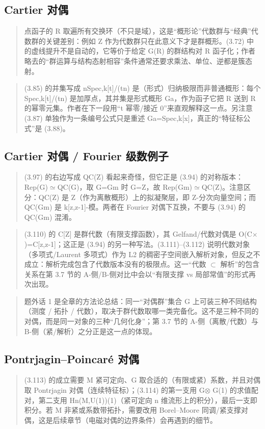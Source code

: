 \subsection*{Cartier 对偶}
\begin{quote}\small
点函子的 R 取遍所有交换环（不只是域），这是“概形论”代数群与“经典”代数群的关键差别：例如 Z 作为代数群只在此意义下才是群概形。(3.72) 中的虚线提升不是自动的，它等价于给定 G(R) 的群结构对 R 函子化；作者略去的“群运算与结构态射相容”条件通常还要求乘法、单位、逆都是簇态射。
\end{quote}

\begin{quote}\small
(3.85) 的并集写成 nSpec,k[t]/(tn) 是（形式）归纳极限而非普通概形：每个 Spec,k[t]/(tn) 是加厚点，其并集是形式概形 Ga，作为函子它把 R 送到 R 的幂零元集。作者在下一段用“t 幂零/接近 0”来直观解释这一点。另注意 (3.87) 单独作为一条编号公式只是重述 Ga=Spec,k[x]，真正的“特征标公式”是 (3.88)。
\end{quote}

\subsection*{Cartier 对偶 / Fourier 级数例子}
\begin{quote}\small
(3.97) 的右边写成 QC(Z) 看起来奇怪，但它正是 (3.94) 的对称版本：Rep(G)$\simeq$QC(G)，取 G=Gm 时 G=Z，故 Rep(Gm)$\simeq$QC(Z)。注意区分：QC(Z) 是 Z（作为离散概形）上的拟凝聚层，即 Z-分次向量空间；而 QC(Gm) 是 k[z,z-1]-模。两者在 Fourier 对偶下互换，不要与 (3.94) 的 QC(Gm) 混淆。
\end{quote}

\begin{quote}\small
(3.110) 的 C[Z] 是群代数（有限支撑函数），其 Gelfand/代数对偶是 O(C$\times$)=C[z,z-1]；这正是 (3.94) 的另一种写法。(3.111)--(3.112) 说明代数对象（多项式/Laurent 多项式）作为 L2 的稠密子空间嵌入解析对象，但反之不成立：解析完成包含了代数版本没有的极限点。这一“代数 $\subset$ 解析”的包含关系在第 3.7 节的 A-侧/B-侧对比中会以“有限支撑 vs 局部常值”的形式再次出现。
\end{quote}

\begin{quote}\small
题外话 1 是全章的方法论总结：同一“对偶群”集合 G 上可装三种不同结构（测度 / 拓扑 / 代数），取决于群代数取哪一类完备化。这不是三种不同的对偶，而是同一对象的三种“几何化身”；第 3.7 节的 A-侧（离散/代数）与 B-侧（紧/解析）之分正是这一点的体现。
\end{quote}

\subsection*{Pontrjagin--Poincaré 对偶}
\begin{quote}\small
(3.113) 的成立需要 M 紧可定向、G 取合适的（有限或紧）系数，并且对偶取 Pontrjagin 对偶（连续特征标）；(3.114) 的第一支用 G$\otimes$ G(1) 的求值配对，第二支用 Hn(M,U(1))(1)（紧可定向 n 维流形上的积分），最后一支即积分。若 M 非紧或系数带拓扑，需要改用 Borel--Moore 同调/紧支撑对偶，这是后续章节（电磁对偶的边界条件）会再遇到的细节。
\end{quote}

